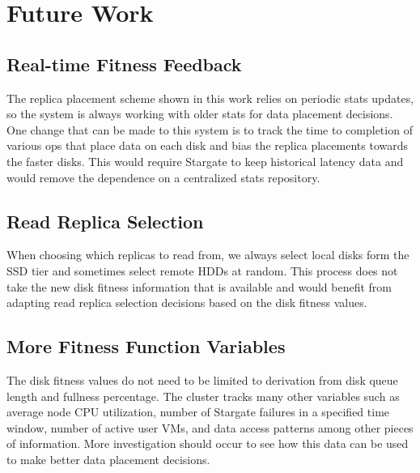 \documentclass[12pt]{article}
\begin{document}
\newpage
\FloatBarrier
\section{Future Work}

  \subsection{Real-time Fitness Feedback}

  The replica placement scheme shown in this work relies on periodic stats
  updates, so the system is always working with older stats for data placement
  decisions. One change that can be made to this system is to track the time to
  completion of various ops that place data on each disk and bias the replica
  placements towards the faster disks. This would require Stargate to keep
  historical latency data and would remove the dependence on a centralized
  stats repository.

  \subsection{Read Replica Selection}

  When choosing which replicas to read from, we always select local disks
  form the SSD tier and sometimes select remote HDDs at random. This process
  does not take the new disk fitness information that is available and would
  benefit from adapting read replica selection decisions based on the disk
  fitness values.

  \subsection{More Fitness Function Variables}

  The disk fitness values do not need to be limited to derivation from disk
  queue length and fullness percentage. The cluster tracks many other variables
  such as average node CPU utilization, number of Stargate failures in a
  specified time window, number of active user VMs, and data access patterns
  among other pieces of information. More investigation should occur to see how
  this data can be used to make better data placement decisions.
\end{document}
